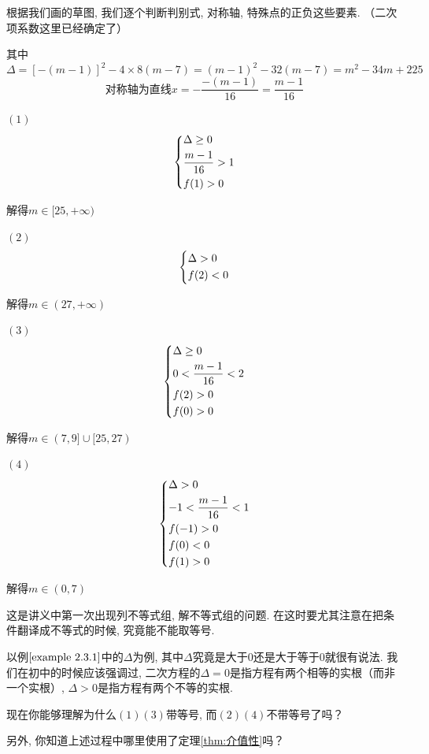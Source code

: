 \begin{jie}
根据我们画的草图, 我们逐个判断判别式, 对称轴, 特殊点的正负这些要素. （二次项系数这里已经确定了）

其中\[\Delta=[-(m-1)]^2-4\times8(m-7)=(m-1)^2-32(m-7)=m^2-34m+225\]
\[\text{对称轴为直线}x=-\frac{-(m-1)}{16}=\frac{m-1}{16}\]

$(1)$ 
\[  
    \left\{
    \begin{lgathered}
    \Delta\geq 0\\
    \frac{m-1}{16}>1\\
    f(1)>0
    \end{lgathered}
    \right.
\]

解得$m \in [25,+\infty)$

$(2)$
\[  
    \left\{
    \begin{lgathered}
    \Delta > 0\\
    f(2)<0
    \end{lgathered}
    \right.
\]

解得$m \in (27,+\infty)$

$(3)$
\[  
    \left\{
    \begin{lgathered}
    \Delta \geq 0\\
    0<\frac{m-1}{16}<2\\
    f(2)>0\\
    f(0)>0
    \end{lgathered}
    \right.
\]

解得$m \in (7,9]\cup[25,27)$

$(4)$
\[  
    \left\{
    \begin{lgathered}
    \Delta > 0\\
    -1<\frac{m-1}{16}<1\\
    f(-1)>0\\
    f(0)<0\\
    f(1)>0
    \end{lgathered}
    \right.
\]

解得$m \in (0,7)$
\end{jie}
\begin{att}
这是讲义中第一次出现列不等式组, 解不等式组的问题. 在这时要尤其注意在把条件翻译成不等式的时候, 究竟能不能取等号. 

以例$\ref*{example 2.3.1}$中的$\Delta$为例, 其中$\Delta$究竟是大于$0$还是大于等于$0$就很有说法. 我们在初中的时候应该强调过, 
二次方程的$\Delta=0$是指方程有两个相等的实根（而非一个实根）, $\Delta>0$是指方程有两个不等的实根. 

现在你能够理解为什么$(1)(3)$带等号, 而$(2)(4)$不带等号了吗？

另外, 你知道上述过程中哪里使用了定理\ref{thm:介值性}吗？
\end{att}

